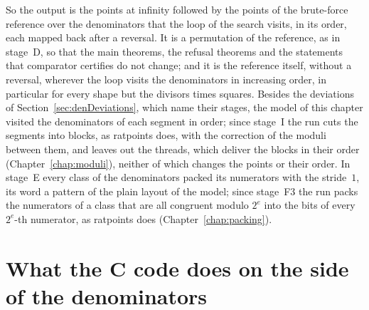 So the output is the points at infinity followed by the points of the brute-force reference over the
denominators that the loop of the search visits, in its order, each mapped back after a reversal. It
is a permutation of the reference, as in stage~D, so that the main theorems, the refusal theorems
and the statements that comparator certifies do not change; and it is the reference itself, without
a reversal, wherever the loop visits the denominators in increasing order, in particular for every
shape but the divisors times squares. Besides the deviations of Section~\ref{sec:denDeviations},
which name their stages, the model of this chapter visited the denominators of each segment in
order; since stage~I the run cuts the segments into blocks, as ratpoints does, with the correction
of the moduli between them, and leaves out the threads, which deliver the blocks in their order
(Chapter~\ref{chap:moduli}), neither of which changes the points or their order. In stage~E every
class of the denominators packed its numerators with the stride~$1$, its word a pattern of the plain
layout of the model; since stage~F3 the run packs the numerators of a class that are all congruent
modulo $2^e$ into the bits of every $2^e$-th numerator, as ratpoints does
(Chapter~\ref{chap:packing}).

\section{What the C code does on the side of the denominators}\label{sec:denC}

